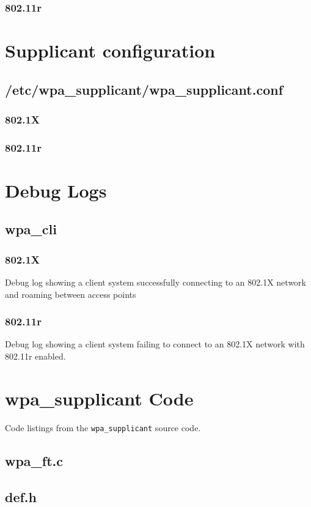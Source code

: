 \subsubsection{802.11r}



\section{Supplicant configuration}
\label{sec:Code;sub:supplicant}

\subsection{/etc/wpa\_supplicant/wpa\_supplicant.conf}
\subsubsection{802.1X}


\subsubsection{802.11r}


\section{Debug Logs}
\subsection{wpa\_cli}
\subsubsection{802.1X}
Debug log showing a client system successfully connecting to an 802.1X network and roaming between access points


\subsubsection{802.11r}
Debug log showing a client system failing to connect to an 802.1X network with 802.11r enabled.


\section{wpa\_supplicant Code}
Code listings from the \verb`wpa_supplicant` source code.
\subsection{wpa\_ft.c}

\subsection{def.h}
